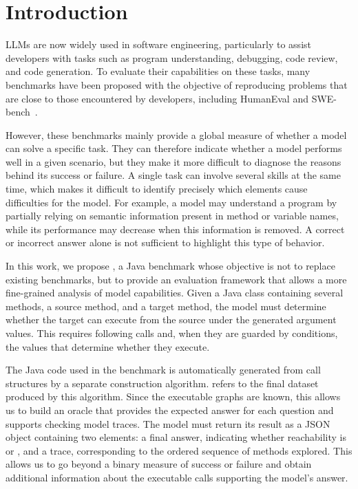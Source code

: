 \section{Introduction}

LLMs are now widely used in software engineering, particularly to assist developers with tasks such as program understanding, debugging, code review, and code generation. To evaluate their capabilities on these tasks, many benchmarks have been proposed with the objective of reproducing problems that are close to those encountered by developers, including HumanEval and SWE-bench~\cite{chen2021codex,jimenez2024swebench}.

However, these benchmarks mainly provide a global measure of whether a model can solve a specific task. They can therefore indicate whether a model performs well in a given scenario, but they make it more difficult to diagnose the reasons behind its success or failure. A single task can involve several skills at the same time, which makes it difficult to identify precisely which elements cause difficulties for the model. For example, a model may understand a program by partially relying on semantic information present in method or variable names, while its performance may decrease when this information is removed. A correct or incorrect answer alone is not sufficient to highlight this type of behavior.

In this work, we propose \benchmark, a Java benchmark whose objective is not to replace existing benchmarks, but to provide an evaluation framework that allows a more fine-grained analysis of model capabilities. Given a Java class containing several methods, a source method, and a target method, the model must determine whether the target can execute from the source under the generated argument values. This requires following calls and, when they are guarded by conditions, the values that determine whether they execute.

The Java code used in the benchmark is automatically generated from call structures by a separate construction algorithm. \benchmark refers to the final dataset produced by this algorithm. Since the executable graphs are known, this allows us to build an oracle that provides the expected answer for each question and supports checking model traces. The model must return its result as a JSON object containing two elements: a final answer, indicating whether reachability is \true{} or \false{}, and a trace, corresponding to the ordered sequence of methods explored. This allows us to go beyond a binary measure of success or failure and obtain additional information about the executable calls supporting the model's answer.

